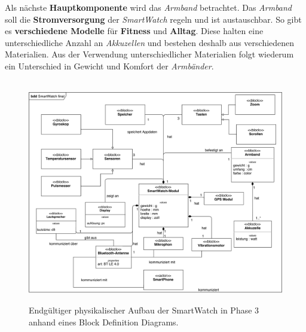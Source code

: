 Als nächste \textbf{Hauptkomponente} wird das \textit{Armband} betrachtet. Das \textit{Armband} soll die \textbf{Stromversorgung} der \textit{SmartWatch} regeln und ist austauschbar. So gibt es \textbf{verschiedene Modelle} für \textbf{Fitness} und \textbf{Alltag}. Diese halten eine unterschiedliche Anzahl an \textit{Akkuzellen} und bestehen deshalb aus verschiedenen Materialien. Aus der Verwendung unterschiedlicher Materialien folgt wiederum ein Unterschied in Gewicht und Komfort der \textit{Armbänder}.
\begin{figure}[h]
\centering\
\includegraphics[width=\textwidth]{img/block2}
\caption{Endgültiger physikalischer Aufbau der SmartWatch in Phase 3 anhand eines Block Definition Diagrams.}\label{fig:block2}
\end{figure}